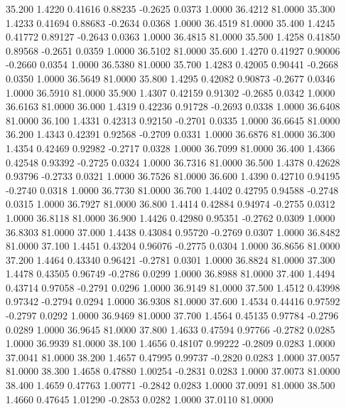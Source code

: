   35.200   1.4220   0.41616   0.88235  -0.2625   0.0373   1.0000  36.4212  81.0000
  35.300   1.4233   0.41694   0.88683  -0.2634   0.0368   1.0000  36.4519  81.0000
  35.400   1.4245   0.41772   0.89127  -0.2643   0.0363   1.0000  36.4815  81.0000
  35.500   1.4258   0.41850   0.89568  -0.2651   0.0359   1.0000  36.5102  81.0000
  35.600   1.4270   0.41927   0.90006  -0.2660   0.0354   1.0000  36.5380  81.0000
  35.700   1.4283   0.42005   0.90441  -0.2668   0.0350   1.0000  36.5649  81.0000
  35.800   1.4295   0.42082   0.90873  -0.2677   0.0346   1.0000  36.5910  81.0000
  35.900   1.4307   0.42159   0.91302  -0.2685   0.0342   1.0000  36.6163  81.0000
  36.000   1.4319   0.42236   0.91728  -0.2693   0.0338   1.0000  36.6408  81.0000
  36.100   1.4331   0.42313   0.92150  -0.2701   0.0335   1.0000  36.6645  81.0000
  36.200   1.4343   0.42391   0.92568  -0.2709   0.0331   1.0000  36.6876  81.0000
  36.300   1.4354   0.42469   0.92982  -0.2717   0.0328   1.0000  36.7099  81.0000
  36.400   1.4366   0.42548   0.93392  -0.2725   0.0324   1.0000  36.7316  81.0000
  36.500   1.4378   0.42628   0.93796  -0.2733   0.0321   1.0000  36.7526  81.0000
  36.600   1.4390   0.42710   0.94195  -0.2740   0.0318   1.0000  36.7730  81.0000
  36.700   1.4402   0.42795   0.94588  -0.2748   0.0315   1.0000  36.7927  81.0000
  36.800   1.4414   0.42884   0.94974  -0.2755   0.0312   1.0000  36.8118  81.0000
  36.900   1.4426   0.42980   0.95351  -0.2762   0.0309   1.0000  36.8303  81.0000
  37.000   1.4438   0.43084   0.95720  -0.2769   0.0307   1.0000  36.8482  81.0000
  37.100   1.4451   0.43204   0.96076  -0.2775   0.0304   1.0000  36.8656  81.0000
  37.200   1.4464   0.43340   0.96421  -0.2781   0.0301   1.0000  36.8824  81.0000
  37.300   1.4478   0.43505   0.96749  -0.2786   0.0299   1.0000  36.8988  81.0000
  37.400   1.4494   0.43714   0.97058  -0.2791   0.0296   1.0000  36.9149  81.0000
  37.500   1.4512   0.43998   0.97342  -0.2794   0.0294   1.0000  36.9308  81.0000
  37.600   1.4534   0.44416   0.97592  -0.2797   0.0292   1.0000  36.9469  81.0000
  37.700   1.4564   0.45135   0.97784  -0.2796   0.0289   1.0000  36.9645  81.0000
  37.800   1.4633   0.47594   0.97766  -0.2782   0.0285   1.0000  36.9939  81.0000
  38.100   1.4656   0.48107   0.99222  -0.2809   0.0283   1.0000  37.0041  81.0000
  38.200   1.4657   0.47995   0.99737  -0.2820   0.0283   1.0000  37.0057  81.0000
  38.300   1.4658   0.47880   1.00254  -0.2831   0.0283   1.0000  37.0073  81.0000
  38.400   1.4659   0.47763   1.00771  -0.2842   0.0283   1.0000  37.0091  81.0000
  38.500   1.4660   0.47645   1.01290  -0.2853   0.0282   1.0000  37.0110  81.0000
